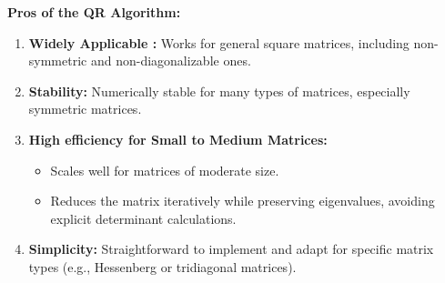 \documentclass[journal,12pt,onecolumn]{IEEEtran}
\theoremstyle{remark}
\begin{document}
\textbf{Pros of the QR Algorithm:}
\begin{enumerate}
    \item \textbf{Widely Applicable :} Works for general square matrices, including non-symmetric and non-diagonalizable ones.\\

    \item \textbf{Stability:} Numerically stable for many types of matrices, especially symmetric matrices.\\

    \item \textbf{High efficiency for Small to Medium Matrices:}
    \begin{itemize}
        \item Scales well for matrices of moderate size.
        \item Reduces the matrix iteratively while preserving eigenvalues, avoiding explicit determinant calculations.\\
    \end{itemize}
    \item \textbf{Simplicity:} Straightforward to implement and adapt for specific matrix types (e.g., Hessenberg or tridiagonal matrices).\\
\end{enumerate}
\end{document}
